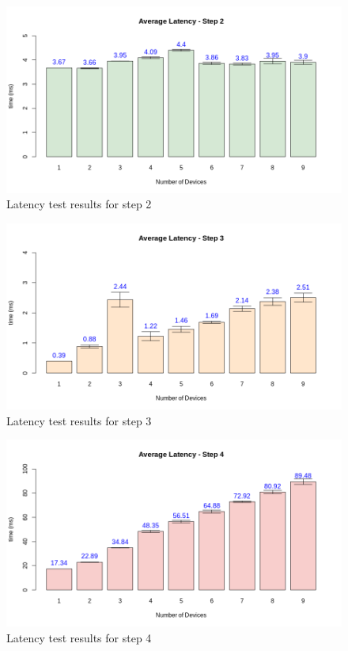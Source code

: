 \begin{figure}[h!]
    \centering
    \includegraphics[width = .8\linewidth]{Figures/latency-st2.png}
    \caption{Latency test results for step 2}
    \label{fig:latency-result-2}
\end{figure}

\begin{figure}[h!]
    \centering
    \includegraphics[width = .8\linewidth]{Figures/latency-st3.png}
    \caption{Latency test results for step 3}
    \label{fig:latency-result-3}
\end{figure}

\begin{figure}[h!]
    \centering
    \includegraphics[width = .8\linewidth]{Figures/latency-st4.png}
    \caption{Latency test results for step 4}
    \label{fig:latency-result-4}
\end{figure}



